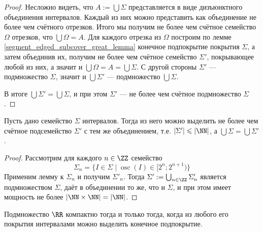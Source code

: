 \documentclass[12pt,a4paper]{article}
\DeclareMathOperator{\osc}{osc}
\begin{document}
    \begin{proof}
        Несложно видеть, что $A := \bigcup \Sigma$ представляется в виде дизъюнктного объединения интервалов. Каждый из них можно представить как объединение не более чем счётного отрезков. Итого мы получим не более чем счётное семейство $\Omega$ отрезков, что $\bigcup \Omega = A$. Для каждого отрезка из $\Omega$ построим по лемме \ref{segment_edged_subcover_great_lemma} конечное подпокрытие покрытия $\Sigma$, а затем объединив их, получим не более чем счётное семейство $\Sigma'$, покрывающее любой из них, а значит и $\bigcup \Omega = A = \bigcup \Sigma$. С другой стороны $\Sigma'$ --- подмножество $\Sigma$, значит и $\bigcup \Sigma'$ --- подмножество $\bigcup \Sigma$.

        В итоге $\bigcup \Sigma' = \bigcup \Sigma$, и при этом $\Sigma'$ --- не более чем счётное подмножество $\Sigma$.
    \end{proof}

    \begin{lemma}
        Пусть дано семейство $\Sigma$ интервалов. Тогда из него можно выделить не более чем счётное подсемейство $\Sigma'$ с тем же объединением, т.е. $|\Sigma'| \leqslant |\NN|$, а $\bigcup \Sigma = \bigcup \Sigma'$.
    \end{lemma}

    \begin{proof}
        Рассмотрим для каждого $n \in \ZZ$ семейство
        \[\Sigma_n = \{I \in \Sigma \mid \osc(I) \in [2^n; 2^{n+1})\}\]
        Применим лемму к $\Sigma_n$ и получим $\Sigma'_n$. Тогда $\Sigma' := \bigcup_{n \in \ZZ} \Sigma'_n$ является подмножеством $\Sigma$, даёт в объединении то же, что и $\Sigma$, и при этом имеет мощность не более $|\NN \times \NN| = |\NN|$.
    \end{proof}

    \begin{theorem}
        Подмножество $\RR$ компактно тогда и только тогда, когда из любого его покрытия интервалами можно выделить конечное подпокрытие.
    \end{theorem}
\end{document}
